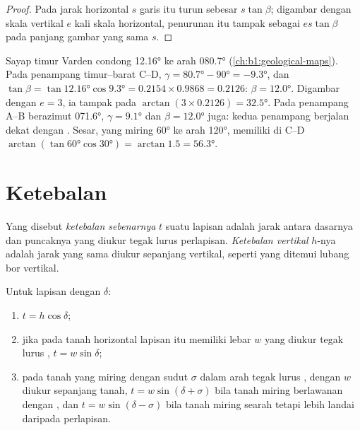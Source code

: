 \begin{proof}
Pada jarak horizontal $s$ garis itu turun sebesar $s\tan\beta$; digambar dengan skala vertikal $e$ kali skala horizontal, penurunan itu tampak sebagai $es\tan\beta$ pada panjang gambar yang sama $s$.
\end{proof}

\begin{example}
Sayap timur  Varden condong \ang{12.16} ke arah \ang{080.7} (\cref{ch:b1:geological-maps}). Pada penampang timur--barat C--D, $\gamma = \ang{80.7} - \ang{90} = \ang{-9.3}$, dan $\tan\beta =
\tan\ang{12.16}\cos\ang{9.3} = 0.2154\times0.9868 = 0.2126$: $\beta =
\ang{12.0}$. Digambar dengan $e = 3$, ia tampak pada $\arctan(3\times0.2126) =
\ang{32.5}$. Pada penampang A--B berazimut \ang{071.6}, $\gamma = \ang{9.1}$
dan $\beta = \ang{12.0}$ juga: kedua penampang berjalan dekat dengan . Sesar, yang miring \ang{60} ke arah \ang{120}, memiliki di C--D 
$\arctan(\tan\ang{60}\cos\ang{30}) = \arctan 1.5 = \ang{56.3}$.
\end{example}

\section{Ketebalan}

\begin{definition}\label{def:b1:cross-sections:thickness}
Yang disebut \emph{ketebalan sebenarnya} $t$ suatu lapisan adalah jarak antara dasarnya dan puncaknya yang diukur tegak lurus perlapisan. \emph{Ketebalan vertikal} $h$-nya adalah jarak yang sama diukur sepanjang vertikal, seperti yang ditemui lubang bor vertikal.
\end{definition}

\begin{proposition}\label{prop:b1:cross-sections:thickness}
Untuk lapisan dengan  $\delta$:
\begin{enumerate}
  \item $t = h\cos\delta$;
  \item jika pada tanah horizontal  lapisan itu memiliki lebar $w$ yang diukur tegak lurus , $t = w\sin\delta$;
  \item pada tanah yang miring dengan sudut $\sigma$ dalam arah tegak lurus , dengan $w$ diukur sepanjang tanah, $t = w\sin(\delta + \sigma)$ bila tanah miring berlawanan dengan , dan $t = w\sin(\delta - \sigma)$ bila tanah miring searah tetapi lebih landai daripada perlapisan.
\end{enumerate}
\end{proposition}

